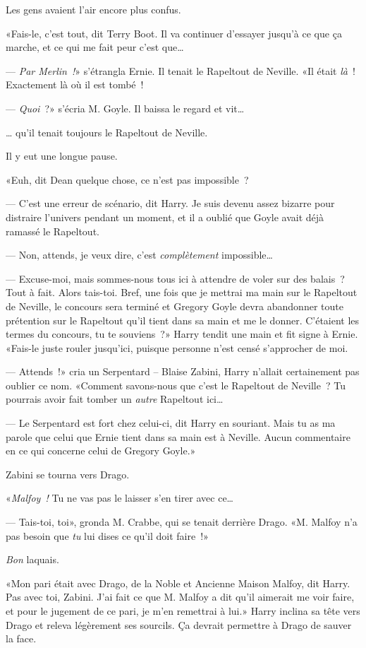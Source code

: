 Les gens avaient l'air encore plus confus.

«Fais-le, c'est tout, dit Terry Boot. Il va continuer d'essayer jusqu'à ce que ça marche, et ce qui me fait peur c'est que…

--- \emph{Par Merlin~!}» s'étrangla Ernie. Il tenait le Rapeltout de Neville. «Il était \emph{là}~! Exactement là où il est tombé~!

--- \emph{Quoi}~?» s'écria M. Goyle. Il baissa le regard et vit…

… qu'il tenait toujours le Rapeltout de Neville.

Il y eut une longue pause.

«Euh, dit Dean quelque chose, ce n'est pas impossible~?

--- C'est une erreur de scénario, dit Harry. Je suis devenu assez bizarre pour distraire l'univers pendant un moment, et il a oublié que Goyle avait déjà ramassé le Rapeltout.

--- Non, attends, je veux dire, c'est \emph{complètement} impossible…

--- Excuse-moi, mais sommes-nous tous ici à attendre de voler sur des balais~? Tout à fait. Alors tais-toi. Bref, une fois que je mettrai ma main sur le Rapeltout de Neville, le concours sera terminé et Gregory Goyle devra abandonner toute prétention sur le Rapeltout qu'il tient dans sa main et me le donner. C'étaient les termes du concours, tu te souviens~?» Harry tendit une main et fit signe à Ernie. «Fais-le juste rouler jusqu'ici, puisque personne n'est censé s'approcher de moi.

--- Attends~!» cria un Serpentard -- Blaise Zabini, Harry n'allait certainement pas oublier ce nom. «Comment savons-nous que c'est le Rapeltout de Neville~? Tu pourrais avoir fait tomber un \emph{autre} Rapeltout ici…

--- Le Serpentard est fort chez celui-ci, dit Harry en souriant. Mais tu as ma parole que celui que Ernie tient dans sa main est à Neville. Aucun commentaire en ce qui concerne celui de Gregory Goyle.»

Zabini se tourna vers Drago.

«\emph{Malfoy~!} Tu ne vas pas le laisser s'en tirer avec ce…

--- Tais-toi, toi», gronda M. Crabbe, qui se tenait derrière Drago. «M. Malfoy n'a pas besoin que \emph{tu} lui dises ce qu'il doit faire~!»

\emph{Bon} laquais.

«Mon pari était avec Drago, de la Noble et Ancienne Maison Malfoy, dit Harry. Pas avec toi, Zabini. J'ai fait ce que M. Malfoy a dit qu'il aimerait me voir faire, et pour le jugement de ce pari, je m'en remettrai à lui.» Harry inclina sa tête vers Drago et releva légèrement ses sourcils. Ça devrait permettre à Drago de sauver la face.

